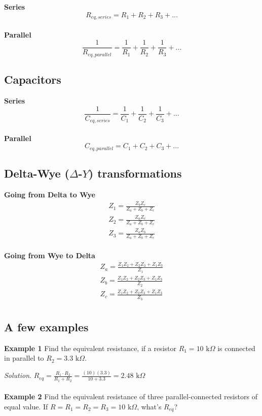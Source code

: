 \documentclass[11pt]{book}
\begin{document}
\textbf{Series}
\begin{equation}
	\label{req,ser}
	R_{eq,series} = R_1 + R_2 + R_3 + ...
\end{equation}
\\
\textbf{Parallel}
\begin{equation}
	\label{req,par}
	\frac{1}{R_{eq,parallel}} = \frac{1}{R_1} + \frac{1}{R_2} + \frac{1}{R_3} + ...
\end{equation}


\subsection{Capacitors}
\textbf{Series}
\begin{equation}
	\frac{1}{C_{eq,series}} = \frac{1}{C_1} + \frac{1}{C_2} + \frac{1}{C_3} + ...
\end{equation}
\\
\textbf{Parallel}
\begin{equation}
	C_{eq,parallel} = C_1 + C_2 + C_3 + ...
\end{equation}

\subsection{Delta-Wye ($\Delta$-$Y$) transformations}
\textbf{Going from Delta to Wye}
\begin{align}
	Z_1 = \frac{Z_b Z_c}{Z_a+Z_b+Z_c} \\
	Z_2 = \frac{Z_a Z_c}{Z_a+Z_b+Z_c} \\
	Z_3 = \frac{Z_a Z_b}{Z_a+Z_b+Z_c}
\end{align}
\\
\textbf{Going from Wye to Delta}
\begin{align}
	Z_a = \frac{Z_1Z_2 + Z_2Z_3 + Z_1Z_3}{Z_1} \\
	Z_b = \frac{Z_1Z_2 + Z_2Z_3 + Z_1Z_3}{Z_2} \\
	Z_c = \frac{Z_1Z_2 + Z_2Z_3 + Z_1Z_3}{Z_3} \\
\end{align}

\subsection{A few examples}
\textbf{Example 1}
Find the equivalent resistance, if a resistor $R_1 = 10 \text{ k}\Omega$ is connected in parallel to $R_2 = 3.3 \text{ k}\Omega$.

\textit{Solution}. $R_{eq} = \frac{R_1 \cdot R_2}{R_1 + R_2} = \frac{(10)(3.3)}{10 + 3.3} = 2.48 \text{ k}\Omega$
\\
\\
\textbf{Example 2}
Find the equivalent resistance of three parallel-connected resistors of equal value. If $R = R_1 = R_2 = R_3 = 10 \text{ k}\Omega$, what's $R_{eq}$?
\end{document}
